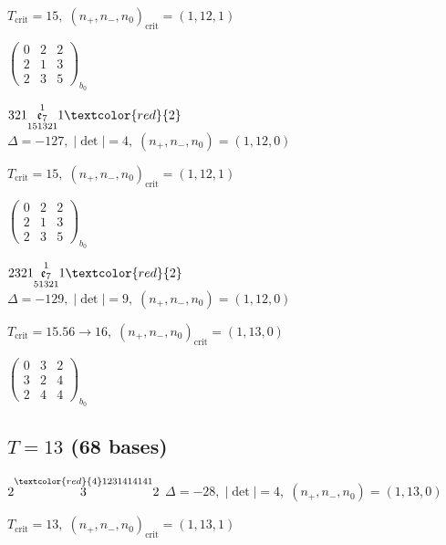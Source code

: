 \documentclass[10pt]{article}
\begin{document}
\hspace{1em}$T_{\text{crit}}=15,\; (n_+,n_-,n_0)_{\text{crit}}=(1,12,1)$

\hspace{2em}$\left(\begin{smallmatrix}0 & 2 & 2 \\ 2 & 1 & 3 \\ 2 & 3 & 5\end{smallmatrix}\right)_{\!b_0}$

\smallskip

$321\overset{1}{\underset{151321}{\mathfrak{e}_7}}1\textcolor{red}{2}$ \quad $\Delta=-127,\; |\det|=4,\; (n_+,n_-,n_0)=(1,12,0)$

\hspace{1em}$T_{\text{crit}}=15,\; (n_+,n_-,n_0)_{\text{crit}}=(1,12,1)$

\hspace{2em}$\left(\begin{smallmatrix}0 & 2 & 2 \\ 2 & 1 & 3 \\ 2 & 3 & 5\end{smallmatrix}\right)_{\!b_0}$

\smallskip

$2321\overset{1}{\underset{51321}{\mathfrak{e}_7}}1\textcolor{red}{2}$ \quad $\Delta=-129,\; |\det|=9,\; (n_+,n_-,n_0)=(1,12,0)$

\hspace{1em}$T_{\text{crit}}=15.56 \to 16,\; (n_+,n_-,n_0)_{\text{crit}}=(1,13,0)$

\hspace{2em}$\left(\begin{smallmatrix}0 & 3 & 2 \\ 3 & 2 & 4 \\ 2 & 4 & 4\end{smallmatrix}\right)_{\!b_0}$


\subsection*{$T = 13$ \quad (68 bases)}
\smallskip

$2\overset{\textcolor{red}{4}1231414141}{3}2$ \quad $\Delta=-28,\; |\det|=4,\; (n_+,n_-,n_0)=(1,13,0)$

\hspace{1em}$T_{\text{crit}}=13,\; (n_+,n_-,n_0)_{\text{crit}}=(1,13,1)$
\end{document}

